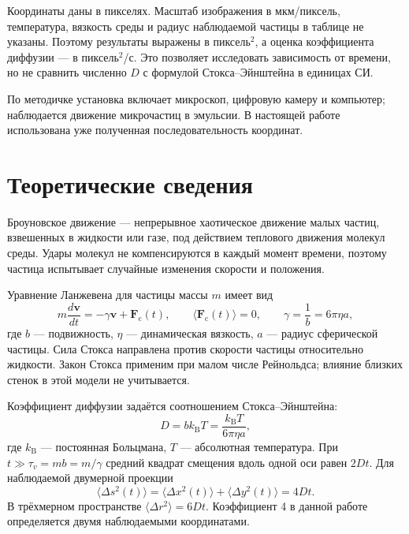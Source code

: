 \documentclass[12pt,a4paper]{article}
\begin{document}
Координаты даны в пикселях. Масштаб изображения в мкм/пиксель, температура,
вязкость среды и радиус наблюдаемой частицы в таблице не указаны. Поэтому
результаты выражены в пиксель$^2$, а оценка коэффициента диффузии ---
в пиксель$^2$/с. Это позволяет исследовать зависимость от времени,
но не сравнить численно $D$ с формулой Стокса--Эйнштейна в единицах СИ.

По методичке установка включает микроскоп, цифровую камеру и компьютер;
наблюдается движение микрочастиц в эмульсии. В настоящей работе
использована уже полученная последовательность координат.

\section{Теоретические сведения}
Броуновское движение --- непрерывное хаотическое движение малых частиц,
взвешенных в жидкости или газе, под действием теплового движения молекул
среды. Удары молекул не компенсируются в каждый момент времени, поэтому
частица испытывает случайные изменения скорости и положения.

Уравнение Ланжевена для частицы массы $m$ имеет вид
\begin{equation}
 m\frac{d\mathbf v}{dt}=-\gamma\mathbf v+\mathbf F_{\mathrm c}(t),
 \qquad \langle\mathbf F_{\mathrm c}(t)\rangle=0,
 \qquad \gamma=\frac1b=6\pi\eta a,
\end{equation}
где $b$ --- подвижность, $\eta$ --- динамическая вязкость,
$a$ --- радиус сферической частицы. Сила Стокса направлена против скорости
частицы относительно жидкости. Закон Стокса применим при малом числе
Рейнольдса; влияние близких стенок в этой модели не учитывается.

Коэффициент диффузии задаётся соотношением Стокса--Эйнштейна:
\begin{equation}
 D=bk_{\mathrm B}T=\frac{k_{\mathrm B}T}{6\pi\eta a},
 \label{eq:diffusion}
\end{equation}
где $k_{\mathrm B}$ --- постоянная Больцмана, $T$ --- абсолютная температура.
При $t\gg\tau_v=mb=m/\gamma$ средний квадрат смещения вдоль одной оси
равен $2Dt$. Для наблюдаемой двумерной проекции
\begin{equation}
 \boxed{\langle\Delta s^2(t)\rangle
 =\langle\Delta x^2(t)\rangle+\langle\Delta y^2(t)\rangle=4Dt.}
 \label{eq:einstein}
\end{equation}
В трёхмерном пространстве $\langle\Delta r^2\rangle=6Dt$.
Коэффициент 4 в данной работе определяется двумя наблюдаемыми координатами.
\end{document}
